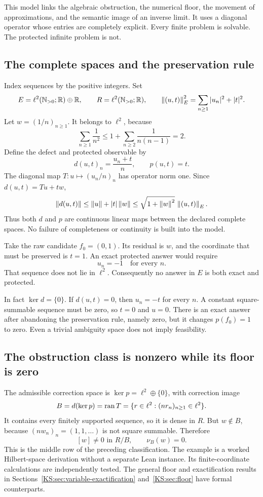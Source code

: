 \label{KS:sec:escape}
This model links the algebraic obstruction, the numerical floor, the movement of approximations, and the semantic image of an inverse limit. It uses a diagonal operator whose entries are completely explicit. Every finite problem is solvable. The protected infinite problem is not.

\subsection{The complete spaces and the preservation rule}
Index sequences by the positive integers. Set
\[
 E=\ell^2(\mathbb N_{>0};\mathbb R)\oplus\mathbb R,\qquad
 R=\ell^2(\mathbb N_{>0};\mathbb R),\qquad
 \left\lVert(u,t)\right\rVert_E^2=\sum_{n\ge1}|u_n|^2+|t|^2.
\]
Let \(w=(1/n)_{n\ge1}\). It belongs to \(\ell^2\), because
\[
 \sum_{n\ge1}\frac1{n^2}
 \le1+\sum_{n\ge2}\frac1{n(n-1)}=2.
\]
Define the defect and protected observable by
\[
 d(u,t)_n=\frac{u_n+t}{n},\qquad p(u,t)=t.
\]
The diagonal map \(T:u\mapsto(u_n/n)_n\) has operator norm one. Since \(d(u,t)=Tu+tw\),
\[
 \left\lVert d(u,t)\right\rVert\le\left\lVert u\right\rVert+|t|\left\lVert w\right\rVert
 \le\sqrt{1+\left\lVert w\right\rVert^2}\,\left\lVert(u,t)\right\rVert_E.
\]
Thus both \(d\) and \(p\) are continuous linear maps between the declared complete spaces. No failure of completeness or continuity is built into the model.

Take the raw candidate \(f_0=(0,1)\). Its residual is \(w\), and the coordinate that must be preserved is \(t=1\). An exact protected answer would require
\[
 u_n=-1\quad\text{for every }n.
\]
That sequence does not lie in \(\ell^2\). Consequently no answer in \(E\) is both exact and protected.

In fact \(\ker d=\{0\}\). If \(d(u,t)=0\), then \(u_n=-t\) for every \(n\). A constant square-summable sequence must be zero, so \(t=0\) and \(u=0\). There is an exact answer after abandoning the preservation rule, namely zero, but it changes \(p(f_0)=1\) to zero. Even a trivial ambiguity space does not imply feasibility.

\subsection{The obstruction class is nonzero while its floor is zero}
The admissible correction space is \(\ker p=\ell^2\oplus\{0\}\), with correction image
\[
 B=d(\ker p)=\operatorname{ran} T
  =\{r\in\ell^2:(nr_n)_{n\ge1}\in\ell^2\}.
\]
It contains every finitely supported sequence, so it is dense in \(R\). But \(w\notin B\), because \((nw_n)_n=(1,1,\ldots)\) is not square summable. Therefore
\[
 [w]\ne0\text{ in }R/B,\qquad \nu_B(w)=0.
\]
This is the middle row of the preceding classification. The example is a worked Hilbert-space derivation without a separate Lean instance. Its finite-coordinate calculations are independently tested. The general floor and exactification results in Sections~\ref{KS:sec:variable-exactification} and~\ref{KS:sec:floor} have formal counterparts.

